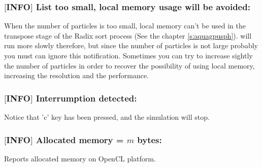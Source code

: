 %
\subsubsection{$[$INFO$]$ List too small, local memory usage will be avoided:}
%
When the number of particles is too small, local memory can't be used in the transpose
stage of the Radix sort process (See the chapter \ref{s:aquagpusph}). \NAME will run more slowly
therefore, but since the number of particles is not large probably you must can ignore
this notification.\rc
Sometimes you can try to increase sightly the number of particles in order to recover
the possibility of using local memory, increasing the resolution and the performance.
%
\subsubsection{$[$INFO$]$ Interrumption detected:}
%
Notice that 'c' key has been pressed, and the simulation will stop.
%
\subsubsection{$[$INFO$]$ Allocated memory = $m$ bytes:}
%
Reports allocated memory on OpenCL platform.
%
